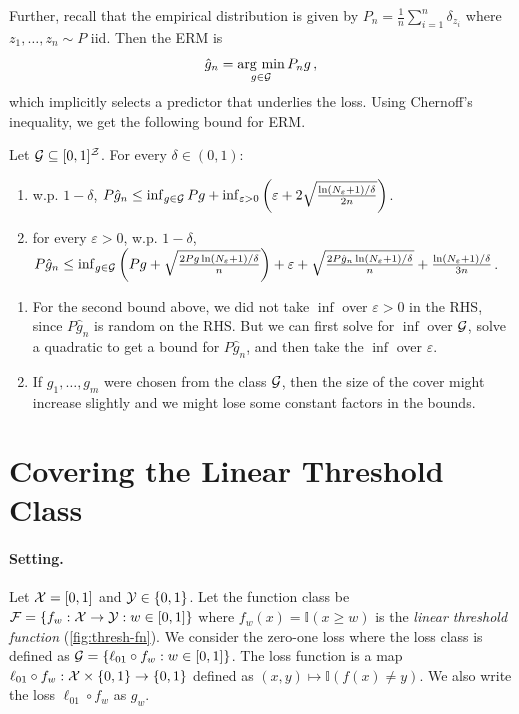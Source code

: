 \documentclass[twoside]{article}
\newcommand{\set}[1]{\left\{#1\right\}}
\newcommand{\I}{\mathbb{I}}
\begin{document}
Further, recall that the empirical distribution is given by $P_n = \frac1n \sum_{i=1}^n \delta_{z_i}$ where $z_1,\dots,z_n \sim P$ iid. Then the ERM is
\[
    \hat{g}_n = \operatorname*{arg\ min}_{g \in \mathcal{G}} P_n g \,,
\]
which implicitly selects a predictor that underlies the loss. Using Chernoff's inequality, we get the following bound for ERM.
\begin{proposition}
    Let $\mathcal{G} \subseteq [0,1]^{\mathcal{Z}}$. For every $\delta \in (0,1)$:
    \begin{enumerate}
        \item w.p. $1-\delta$, $P\hat{g}_n \le \inf_{g \in \mathcal{G}} Pg + \inf_{\varepsilon > 0} \left( \varepsilon + 2 \sqrt{\frac{\ln (N_{\varepsilon}+1)/\delta}{2n}} \right)$.
        \item for every $\varepsilon > 0$,  w.p. $1-\delta$, $P\hat{g}_n \le \inf_{g \in \mathcal{G}} \left(Pg + \sqrt{\frac{2Pg \ln (N_{\varepsilon}+1)/\delta}{n}} \right) + \varepsilon + \sqrt{\frac{2P\hat{g}_n \ln (N_{\varepsilon}+1)/\delta}{n}} + \frac{\ln(N_{\varepsilon}+1)/\delta}{3n}$.
    \end{enumerate}
\end{proposition}
\begin{remark}
    \begin{enumerate}
        \item For the second bound above, we did not take $\inf$ over $\varepsilon > 0$ in the RHS, since $P\hat{g}_n$ is random on the RHS. But we can first solve for $\inf$ over $\mathcal{G}$, solve a quadratic to get a bound for $P\hat{g}_n$, and then take the $\inf$ over $\varepsilon$.
        \item If $g_1, \dots, g_m$ were chosen from the class $\mathcal{G}$, then the size of the cover might increase slightly and we might lose some constant factors in the bounds.
    \end{enumerate}
\end{remark}


\section{Covering the Linear Threshold Class}
\paragraph{Setting.} 
Let $\mathcal{X} = [0,1]$ and $\cY \in \set{0,1}$. Let the function class be $\cF = \set{f_w: \cX \to \cY : w \in [0,1] }$ where $f_w(x) = \I( x \ge w)$ is the \emph{linear threshold function} (\cref{fig:thresh-fn}). We consider the zero-one loss where the loss class is defined as $\cG = \set{\ell_{01} \circ f_w : w \in [0,1]}$. The loss function is a map $\ell_{01} \circ f_w: \cX \times \set{0,1} \to \set{0,1}$ defined as $(x,y) \mapsto \I(f(x) \ne y)$. We also write the loss $\ell_{01} \circ f_w$ as $g_w$.
\end{document}
